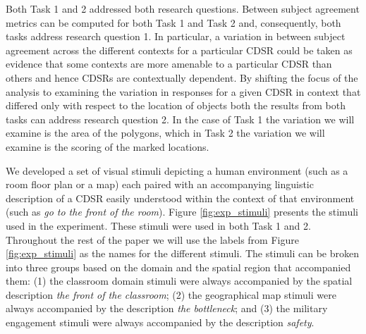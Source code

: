 \documentclass[11pt,letterpaper]{article}
\begin{document}
Both Task 1 and 2 addressed both research questions. Between subject agreement metrics can be computed for both Task 1 and Task 2 and, consequently, both tasks address research question 1. In particular, a variation in between subject agreement across the different contexts for a particular CDSR could be taken as evidence that some contexts are more amenable to a particular CDSR than others and hence CDSRs are contextually dependent. By shifting the focus of the analysis to examining the variation in responses for a given CDSR in context that differed only with respect to the location of objects both the results from both tasks can address research question 2. In the case of Task 1 the variation we will examine is the area of the polygons, which in Task 2 the variation we will examine is the scoring of the marked locations. 

We developed a set of visual stimuli depicting a human environment (such as a room floor plan or a map) each paired with an accompanying linguistic description of a CDSR easily understood within the context of that environment (such as \emph{go to the front of the room}).  Figure \ref{fig:exp_stimuli} presents the stimuli used in the experiment. These stimuli were used in both Task 1 and 2. Throughout the rest of the paper we will use the labels from Figure \ref{fig:exp_stimuli} as the names for the different stimuli. The stimuli can be broken into three groups based on the domain and the spatial region that accompanied them: (1) the classroom domain stimuli were always accompanied by the spatial description \emph{the front of the classroom}; (2) the geographical map stimuli were always accompanied by the description \emph{the bottleneck}; and (3) the military engagement stimuli were always accompanied by the description \emph{safety}. 
\end{document}
